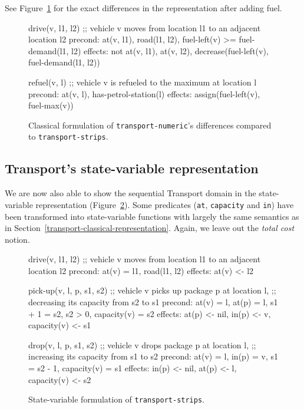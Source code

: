See Figure~\ref{code:classical-numeric} for the exact differences
in the representation after adding fuel.

\begin{figure}[tbp]
\begin{code}
drive(v, l1, l2)
  ;; vehicle v moves from location l1 to an adjacent location l2
  precond: at(v, l1), road(l1, l2), fuel-left(v) >= fuel-demand(l1, l2)
  effects: not at(v, l1), at(v, l2),
           decrease(fuel-left(v),  fuel-demand(l1, l2))
  
refuel(v, l)
  ;; vehicle v is refueled to the maximum at location l
  precond: at(v, l), has-petrol-station(l)
  effects: assign(fuel-left(v), fuel-max(v))
\end{code}
\caption[Partial classical formulation of \texttt{transport-numeric}.]{Classical formulation of \texttt{transport-numeric}'s differences compared to \texttt{transport-strips}.}
\label{code:classical-numeric}
\end{figure}

\subsection{Transport's state-variable representation}

We are now also able to show the sequential Transport domain
in the state-variable representation (Figure~\ref{code:statevar-strips}).
Some predicates (\verb+at+, \verb+capacity+ and \verb+in+) have been transformed
into state-variable functions with largely the same semantics as in
Section~\ref{transport-classical-representation}. Again, we leave out
the \textit{total cost} notion.

\begin{figure}[tbp]
\begin{code}
drive(v, l1, l2)
  ;; vehicle v moves from location l1 to an adjacent location l2
  precond: at(v) = l1, road(l1, l2)
  effects: at(v) <- l2

pick-up(v, l, p, s1, s2)
  ;; vehicle v picks up package p at location l,
  ;; decreasing its capacity from s2 to s1
  precond: at(v) = l, at(p) = l, s1 + 1 = s2, s2 > 0, capacity(v) = s2
  effects: at(p) <- nil, in(p) <- v, capacity(v) <- s1
  
drop(v, l, p, s1, s2)
  ;; vehicle v drops package p at location l,
  ;; increasing its capacity from s1 to s2
  precond: at(v) = l, in(p) = v, s1 = s2 - 1, capacity(v) = s1
  effects: in(p) <- nil, at(p) <- l, capacity(v) <- s2
\end{code}
\caption{State-variable formulation of \texttt{transport-strips}.}
\label{code:statevar-strips}
\end{figure}

